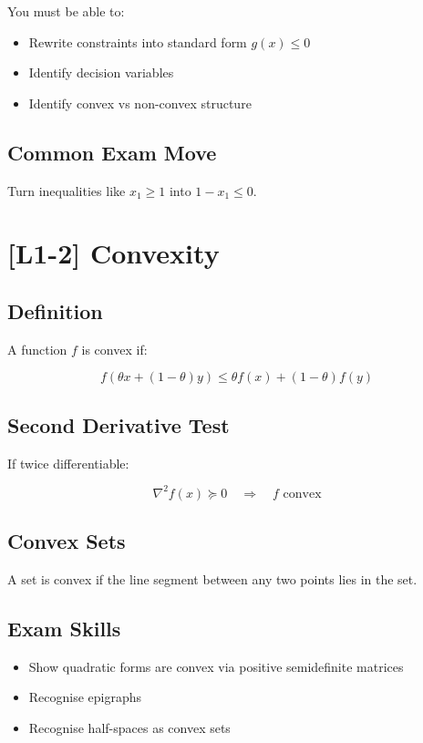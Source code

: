 \documentclass[11pt]{article}
\begin{document}
You must be able to:

\begin{itemize}
\item Rewrite constraints into standard form $g(x)\le0$
\item Identify decision variables
\item Identify convex vs non-convex structure
\end{itemize}

\subsection*{Common Exam Move}

Turn inequalities like $x_1 \ge 1$ into $1 - x_1 \le 0$.

\newpage

\section*{[L1-2] Convexity}

\subsection*{Definition}

A function $f$ is convex if:

\[
f(\theta x + (1-\theta)y) \le \theta f(x) + (1-\theta)f(y)
\]

\subsection*{Second Derivative Test}

If twice differentiable:

\[
\nabla^2 f(x) \succeq 0 \quad \Rightarrow \quad f \text{ convex}
\]

\subsection*{Convex Sets}

A set is convex if the line segment between any two points lies in the set.

\subsection*{Exam Skills}

\begin{itemize}
\item Show quadratic forms are convex via positive semidefinite matrices
\item Recognise epigraphs
\item Recognise half-spaces as convex sets
\end{itemize}
\end{document}
